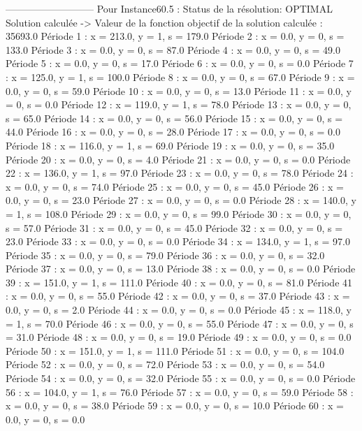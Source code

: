 ---------------------------
Pour Instance60.5  :
Status de la résolution: OPTIMAL
Solution calculée
-> Valeur de la fonction objectif de la solution calculée :  35693.0
Période 1 : x = 213.0, y = 1, s = 179.0
Période 2 : x = 0.0, y = 0, s = 133.0
Période 3 : x = 0.0, y = 0, s = 87.0
Période 4 : x = 0.0, y = 0, s = 49.0
Période 5 : x = 0.0, y = 0, s = 17.0
Période 6 : x = 0.0, y = 0, s = 0.0
Période 7 : x = 125.0, y = 1, s = 100.0
Période 8 : x = 0.0, y = 0, s = 67.0
Période 9 : x = 0.0, y = 0, s = 59.0
Période 10 : x = 0.0, y = 0, s = 13.0
Période 11 : x = 0.0, y = 0, s = 0.0
Période 12 : x = 119.0, y = 1, s = 78.0
Période 13 : x = 0.0, y = 0, s = 65.0
Période 14 : x = 0.0, y = 0, s = 56.0
Période 15 : x = 0.0, y = 0, s = 44.0
Période 16 : x = 0.0, y = 0, s = 28.0
Période 17 : x = 0.0, y = 0, s = 0.0
Période 18 : x = 116.0, y = 1, s = 69.0
Période 19 : x = 0.0, y = 0, s = 35.0
Période 20 : x = 0.0, y = 0, s = 4.0
Période 21 : x = 0.0, y = 0, s = 0.0
Période 22 : x = 136.0, y = 1, s = 97.0
Période 23 : x = 0.0, y = 0, s = 78.0
Période 24 : x = 0.0, y = 0, s = 74.0
Période 25 : x = 0.0, y = 0, s = 45.0
Période 26 : x = 0.0, y = 0, s = 23.0
Période 27 : x = 0.0, y = 0, s = 0.0
Période 28 : x = 140.0, y = 1, s = 108.0
Période 29 : x = 0.0, y = 0, s = 99.0
Période 30 : x = 0.0, y = 0, s = 57.0
Période 31 : x = 0.0, y = 0, s = 45.0
Période 32 : x = 0.0, y = 0, s = 23.0
Période 33 : x = 0.0, y = 0, s = 0.0
Période 34 : x = 134.0, y = 1, s = 97.0
Période 35 : x = 0.0, y = 0, s = 79.0
Période 36 : x = 0.0, y = 0, s = 32.0
Période 37 : x = 0.0, y = 0, s = 13.0
Période 38 : x = 0.0, y = 0, s = 0.0
Période 39 : x = 151.0, y = 1, s = 111.0
Période 40 : x = 0.0, y = 0, s = 81.0
Période 41 : x = 0.0, y = 0, s = 55.0
Période 42 : x = 0.0, y = 0, s = 37.0
Période 43 : x = 0.0, y = 0, s = 2.0
Période 44 : x = 0.0, y = 0, s = 0.0
Période 45 : x = 118.0, y = 1, s = 70.0
Période 46 : x = 0.0, y = 0, s = 55.0
Période 47 : x = 0.0, y = 0, s = 31.0
Période 48 : x = 0.0, y = 0, s = 19.0
Période 49 : x = 0.0, y = 0, s = 0.0
Période 50 : x = 151.0, y = 1, s = 111.0
Période 51 : x = 0.0, y = 0, s = 104.0
Période 52 : x = 0.0, y = 0, s = 72.0
Période 53 : x = 0.0, y = 0, s = 54.0
Période 54 : x = 0.0, y = 0, s = 32.0
Période 55 : x = 0.0, y = 0, s = 0.0
Période 56 : x = 104.0, y = 1, s = 76.0
Période 57 : x = 0.0, y = 0, s = 59.0
Période 58 : x = 0.0, y = 0, s = 38.0
Période 59 : x = 0.0, y = 0, s = 10.0
Période 60 : x = 0.0, y = 0, s = 0.0


